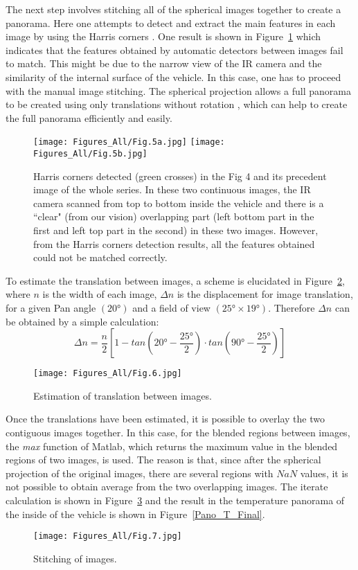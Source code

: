 \documentclass{tQRT2e}
\begin{document}
The next step involves stitching all of the spherical images together to create a panorama. Here one attempts to detect and extract the main features in each image by using the Harris corners \cite{Harris1988}. One result is shown in Figure~\ref{Harris} which indicates that the features obtained by automatic detectors between images fail to match. This might be due to the narrow view of the IR camera and the similarity of the internal surface of the vehicle. In this case, one has to proceed with the manual image stitching.  The spherical projection allows a full panorama to be created using only translations without rotation \cite{Szeliski1997}, which can help to create the full panorama efficiently and easily.
\begin{figure}[ht]
	\texttt{[image: Figures\_All/Fig.5a.jpg]}
	\texttt{[image: Figures\_All/Fig.5b.jpg]}
	\caption{Harris corners detected (green crosses) in the Fig 4 and its precedent image of the whole series. In these two continuous images, the IR camera scanned from top to bottom inside the vehicle and there is a ``clear" (from our vision) overlapping part (left bottom part in the first and left top part in the second) in these two images. However, from the Harris corners detection results, all the features obtained could not be matched correctly.}
	\label{Harris}
\end{figure}

To estimate the translation between images, a scheme is elucidated in Figure~\ref{Trans}, where $ n $ is the width of each image, $ \Delta n $ is the displacement for image translation, for a given Pan angle $ (20°) $ and a field of view $ (25° \times 19°) $. Therefore $ \Delta n $ can be obtained by a simple calculation:
\begin{equation}
\Delta n=\dfrac{n}{2}[1-tan(20°-\dfrac{25°}{2})\cdot tan(90°-\dfrac{25°}{2})]
\end{equation}

\begin{figure}[ht]
	\centering
	\texttt{[image: Figures\_All/Fig.6.jpg]}
	\caption{ Estimation of translation between images.}
	\label{Trans}
\end{figure}

Once the translations have been estimated, it is possible to overlay the two contiguous images together. In this case, for the blended regions between images, the \textit{max} function of Matlab, which returns the maximum value in the blended regions of two images, is used. The reason is that, since after the spherical projection of the original images, there are several regions with $ NaN $ values, it is not possible to obtain average from the two overlapping images. The iterate calculation is shown in Figure~\ref{img_sti} and the result in the temperature panorama of the inside of the vehicle is shown in Figure~\ref{Pano_T_Final}.
\begin{figure}[ht]
	\centering
	\texttt{[image: Figures\_All/Fig.7.jpg]}
	\caption{Stitching of images.}
	\label{img_sti}
\end{figure}
\end{document}
